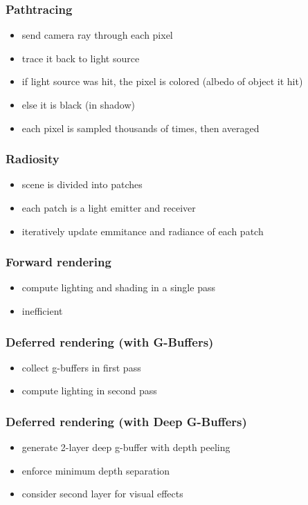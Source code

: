 \documentclass{beamer}
\begin{document}
	\begin{frame}
		\frametitle{Pathtracing}
		\begin{itemize}
			\item send camera ray through each pixel
			\item trace it back to light source
			\item if light source was hit, the pixel is colored (albedo of object it hit)
			\item else it is black (in shadow)
			\item each pixel is sampled thousands of times, then averaged
		\end{itemize}
	\end{frame}

	\begin{frame}
		\frametitle{Radiosity}
		\begin{itemize}
			\item scene is divided into patches
			\item each patch is a light emitter and receiver
			\item iteratively update emmitance and radiance of each patch
		\end{itemize}
	\end{frame}

	\begin{frame}
		\frametitle{Forward rendering}
		\begin{itemize}
			\item compute lighting and shading in a single pass
			\item inefficient
		\end{itemize}
	\end{frame}

	\begin{frame}
		\frametitle{Deferred rendering (with G-Buffers)}
		\begin{itemize}
			\item collect g-buffers in first pass
			\item compute lighting in second pass
		\end{itemize}
	\end{frame}

	\begin{frame}
		\frametitle{Deferred rendering (with Deep G-Buffers)}
		\begin{itemize}
			\item generate 2-layer deep g-buffer with depth peeling
			\item enforce minimum depth separation
			\item consider second layer for visual effects
		\end{itemize}
	\end{frame}	
\end{document}
